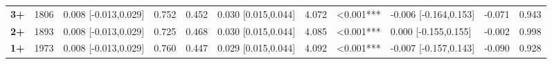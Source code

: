 \documentclass[authordate, empirical]{jote-new-article}
\begin{document}
\begin{table}[h!]
\begin{fullwidth}
{\begin{tabular}{@{} l l l l l l l l l l l @{}}
        \textbf{3+}                                       & 1806       & 0.008 [-0.013,0.029]                            & 0.752                 & 0.452    & 0.030 [0.015,0.044]
                                                          & 4.072      & <0.001***                                       & -0.006 [-0.164,0.153] & -0.071   & 0.943                                \\

        \textbf{2+}                                       & 1893       & 0.008 [-0.013,0.029]                            & 0.725                 & 0.468    & 0.030 [0.015,0.044]
                                                          & 4.085      & <0.001***                                       & 0.000 [-0.155,0.155]  & -0.002   & 0.998                                \\

        \textbf{1+}                                       & 1973       & 0.008 [-0.013,0.029]                            & 0.760                 & 0.447    & 0.029 [0.015,0.044]
                                                          & 4.092      & <0.001***                                       & -0.007 [-0.157,0.143] & -0.090   & 0.928                                \\
      \end{tabular}}
  \end{fullwidth}
\end{table}
\end{document}
